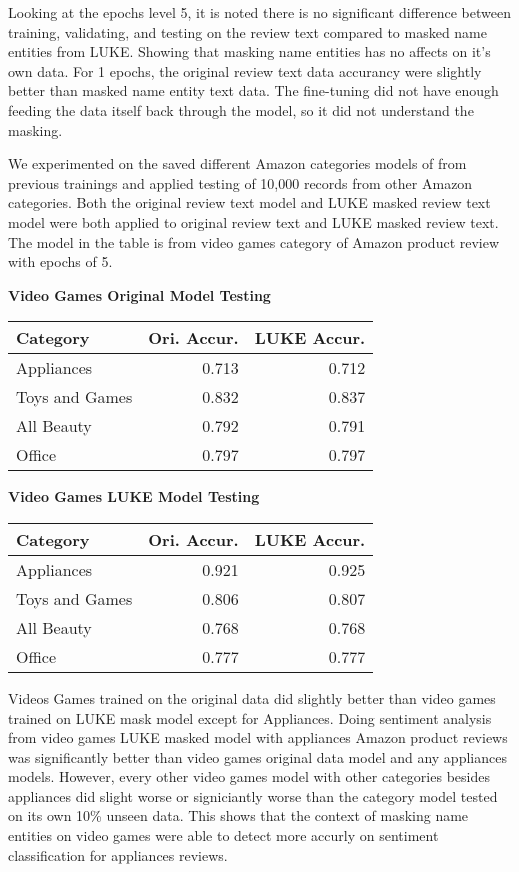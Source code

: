 \documentclass[11pt,a4paper]{article}
\begin{document}
Looking at the epochs level 5, it is noted there is no significant difference between training, validating, and testing on the review text compared to masked name entities from LUKE. Showing that masking name entities has no affects on it's own data. For 1 epochs, the original review text data accurancy were slightly better than masked name entity text data. The fine-tuning did not have enough feeding the data itself back through the model, so it did not understand the masking.

We experimented on the saved different Amazon categories models of from previous trainings and applied testing of 10,000 records from other Amazon categories. Both the original review text model and LUKE masked review text model were both applied to original review text and LUKE masked review text. The model in the table is from video games category of Amazon product review with epochs of 5. \\

\begin{center}
\textbf{Video Games Original Model Testing}
\begin{tabular}{|l|r|r|}
  \hline
   Category & Ori. Accur. & LUKE Accur. \\
  \hline
  Appliances     & 0.713       & 0.712       \\
  Toys and Games & 0.832       & 0.837       \\
  All Beauty     & 0.792       & 0.791       \\
  Office         & 0.797       & 0.797       \\
  \hline
\end{tabular}
\end{center}

\begin{center}
\textbf{Video Games LUKE Model Testing}
\begin{tabular}{|l|r|r|}
  \hline
    Category & Ori. Accur. & LUKE Accur. \\
  \hline
  Appliances     & 0.921       & 0.925       \\
  Toys and Games & 0.806       & 0.807       \\
  All Beauty     & 0.768       & 0.768       \\
  Office         & 0.777       & 0.777       \\
  \hline
\end{tabular}
\end{center}

Videos Games trained on the original data did slightly better than video games trained on LUKE mask model except for Appliances. Doing sentiment analysis from video games LUKE masked model with appliances Amazon product reviews was significantly better than video games original data model and any appliances models. However, every other video games model with other categories besides appliances did slight worse or signiciantly worse than the category model tested on its own 10\% unseen data. This shows that the context of masking name entities on video games were able to detect more accurly on sentiment classification for appliances reviews.
\end{document}
